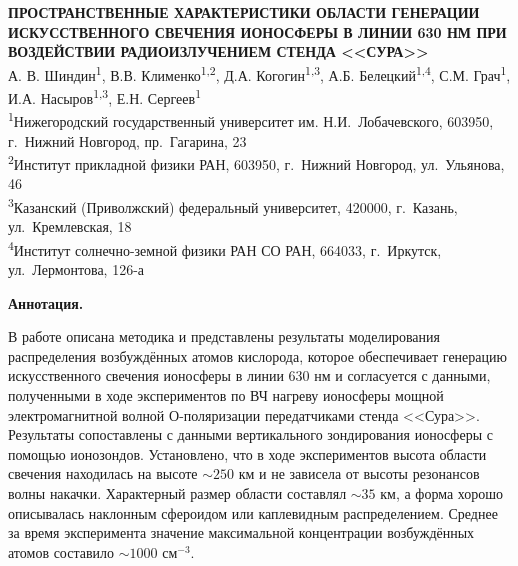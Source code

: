 \documentclass[12pt,a4paper]{article}
\begin{document}

\begin{center}
	{\large\bf ПРОСТРАНСТВЕННЫЕ ХАРАКТЕРИСТИКИ ОБЛАСТИ ГЕНЕРАЦИИ ИСКУССТВЕННОГО СВЕЧЕНИЯ ИОНОСФЕРЫ В ЛИНИИ 630 НМ ПРИ ВОЗДЕЙСТВИИ РАДИОИЗЛУЧЕНИЕМ СТЕНДА <<СУРА>>}\\
	\vskip 0.5cm
	А. В. Шиндин\textsuperscript{1}, В.В. Клименко\textsuperscript{1,2}, Д.А. Когогин\textsuperscript{1,3}, А.Б. Белецкий\textsuperscript{1,4}, С.М. Грач\textsuperscript{1}, И.А. Насыров\textsuperscript{1,3}, Е.Н. Сергеев\textsuperscript{1}\\
	\vskip 0.5cm
	\textsuperscript{1}Нижегородский государственный университет им. Н.И.~Лобачевского,
	603950, г.~Нижний Новгород, пр.~Гагарина, 23\\
	\textsuperscript{2}Институт прикладной физики РАН,
	603950, г.~Нижний Новгород, ул.~Ульянова, 46\\
	\textsuperscript{3}Казанский (Приволжский) федеральный университет,
	420000, г.~Казань, ул.~Кремлевская, 18\\
	\textsuperscript{4}Институт солнечно-земной физики РАН СО РАН,
	664033, г.~Иркутск, ул.~Лермонтова, 126-а\\
\end{center}
\thispagestyle{empty}
\textbf{Аннотация.}
 
В работе описана методика и представлены результаты моделирования распределения 
возбуждённых атомов кислорода, которое обеспечивает генерацию искусственного 
свечения ионосферы в линии 630 нм и согласуется с данными, полученными в ходе 
экспериментов по ВЧ нагреву ионосферы мощной электромагнитной волной 
О-поляризации передатчиками стенда <<Сура>>. Результаты сопоставлены с данными 
вертикального зондирования ионосферы с помощью ионозондов. Установлено, что в 
ходе экспериментов высота области свечения находилась на высоте $\sim250$ км 
и не зависела от высоты резонансов волны накачки. Характерный размер области 
составлял  $\sim35$ км, а форма хорошо описывалась наклонным сфероидом или 
каплевидным распределением. Среднее за время эксперимента значение максимальной 
концентрации возбуждённых атомов составило $\sim1000$ см$^{-3}$.\\
\end{document}
